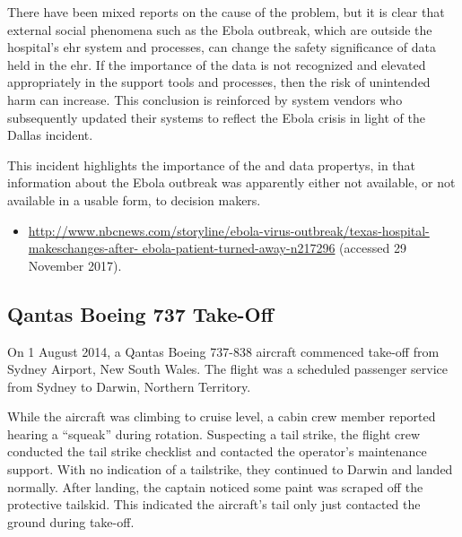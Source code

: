 There have been mixed reports on the cause of the problem, but it is clear that external social phenomena such as the Ebola outbreak, which are outside the hospital's \gls{ehr} system and processes, can change the safety significance of data held in the \gls{ehr}. If the importance of the data is not recognized and elevated appropriately in the support tools and processes, then the risk of unintended harm can increase. This conclusion is reinforced by system vendors who subsequently updated their systems to reflect the Ebola crisis in light of the Dallas incident.

This incident highlights the importance of the  and  \glspl{data property}, in that \gls{information} about the Ebola outbreak was apparently either not available, or not available in a usable form, to decision makers.

\begin{samepage}
\begin{itemize}
  \item \raggedright{\href{http://www.nbcnews.com/storyline/ebola-virus-outbreak/texas-hospital-makeschanges-after-ebola-patient-turned-away-n217296}{http://www.nbcnews.com/storyline/ebola-virus-outbreak/texas-hospital-makeschanges-after- ebola-patient-turned-away-n217296} (accessed 29 November 2017).} 
\end{itemize}
\end{samepage}


\subsection{Qantas Boeing 737 Take-Off} \label{bkm:incacc:qantastakeoff}
On 1 August 2014, a Qantas Boeing 737-838 aircraft commenced take-off from Sydney Airport, New South Wales. The flight was a scheduled passenger service from Sydney to Darwin, Northern Territory.

While the aircraft was climbing to cruise level, a cabin crew member reported hearing a ``squeak'' during rotation. Suspecting a tail strike, the flight crew conducted the tail strike checklist and contacted the operator's maintenance support. With no indication of a tailstrike, they continued to Darwin and landed normally. After landing, the captain noticed some paint was scraped off the protective tailskid. This indicated the aircraft's tail only just contacted the ground during take-off.

